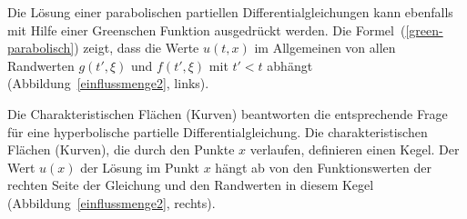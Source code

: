Die Lösung einer parabolischen partiellen Differentialgleichungen 
kann ebenfalls mit Hilfe einer Greenschen Funktion ausgedrückt werden.
Die Formel~(\ref{green-parabolisch}) zeigt, dass die Werte $u(t,x)$
im Allgemeinen von allen Randwerten $g(t',\xi)$ und $f(t',\xi)$
mit $t'<t$ abhängt (Abbildung~\ref{einflussmenge2}, links).

Die Charakteristischen Flächen (Kurven) beantworten die entsprechende
Frage für eine hyperbolische partielle Differentialgleichung.
Die charakteristischen Flächen (Kurven), die durch den Punkte $x$ verlaufen,
definieren einen Kegel.
Der Wert $u(x)$ der Lösung im Punkt $x$ hängt ab von den
Funktionswerten der rechten Seite der Gleichung und den Randwerten
in diesem Kegel
(Abbildung~\ref{einflussmenge2}, rechts).

